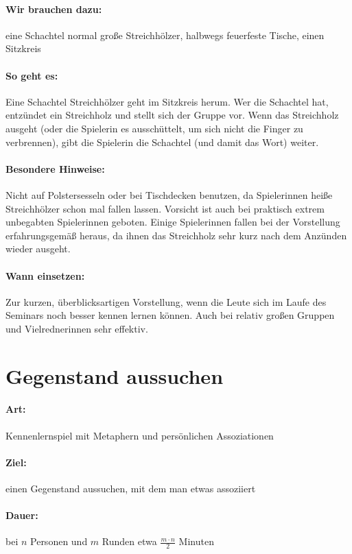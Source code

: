\paragraph{Wir brauchen dazu:} eine Schachtel normal große Streichhölzer, halbwegs feuerfeste Tische, einen Sitzkreis
\paragraph{So geht es:} Eine Schachtel Streichhölzer geht im Sitzkreis herum. Wer die Schachtel hat, entzündet ein Streichholz und stellt sich der Gruppe vor. Wenn das Streichholz ausgeht (oder die Spielerin es ausschüttelt, um sich nicht die Finger zu verbrennen), gibt die Spielerin die Schachtel (und damit das Wort) weiter.
\paragraph{Besondere Hinweise:} Nicht auf Polstersesseln oder bei Tischdecken benutzen, da Spielerinnen heiße Streichhölzer schon mal fallen lassen. Vorsicht ist auch bei praktisch extrem unbegabten Spielerinnen geboten. Einige Spielerinnen fallen bei der Vorstellung erfahrungsgemäß heraus, da ihnen das Streichholz sehr kurz nach dem Anzünden wieder ausgeht.
\paragraph{Wann einsetzen:} Zur kurzen, überblicksartigen Vorstellung, wenn die Leute sich im Laufe des Seminars noch besser kennen lernen können. Auch bei relativ großen Gruppen und Vielrednerinnen sehr effektiv.

\section{Gegenstand aussuchen}
\paragraph{Art:} Kennenlernspiel mit Metaphern und persönlichen Assoziationen
\paragraph{Ziel:} einen Gegenstand aussuchen, mit dem man etwas assoziiert
\paragraph{Dauer:} bei $n$ Personen und $m$ Runden etwa $\frac{m\cdot n}{2}$ Minuten \
